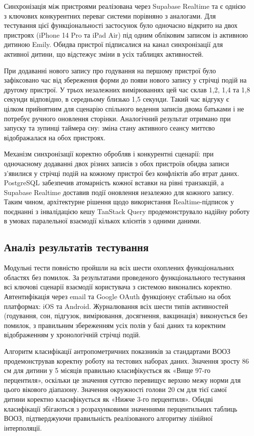 Синхронізація між пристроями реалізована через Supabase Realtime та є однією з ключових конкурентних переваг системи порівняно з аналогами. Для тестування цієї функціональності застосунок було одночасно відкрито на двох пристроях (iPhone 14 Pro та iPad Air) під одним обліковим записом із активною дитиною Emily. Обидва пристрої підписалися на канал синхронізації для активної дитини, що відстежує зміни в усіх таблицях активностей.

При додаванні нового запису про годування на першому пристрої було зафіксовано час від збереження форми до появи нового запису у стрічці подій на другому пристрої. У трьох незалежних вимірюваннях цей час склав 1,2, 1,4 та 1,8 секунди відповідно, в середньому близько 1,5 секунди. Такий час відгуку є цілком прийнятним для сценарію спільного ведення записів двома батьками і не потребує ручного оновлення сторінки. Аналогічний результат отримано при запуску та зупинці таймера сну: зміна стану активного сеансу миттєво відображалася на обох пристроях.

Механізм синхронізації коректно обробляв і конкурентні сценарії: при одночасному додаванні двох різних записів з обох пристроїв обидва записи з'явилися у стрічці подій на кожному пристрої без конфліктів або втрат даних. PostgreSQL забезпечив атомарність кожної вставки на рівні транзакцій, а Supabase Realtime доставив події оновлення незалежно для кожного запису. Таким чином, архітектурне рішення щодо використання Realtime-підписок у поєднанні з інвалідацією кешу TanStack Query продемонструвало надійну роботу в умовах паралельної взаємодії кількох клієнтів з одними даними.

\subsection{Аналіз результатів тестування}

Модульні тести повністю пройшли на всіх шести охоплених функціональних областях без помилок. За результатами проведеного функціонального тестування всі ключові сценарії взаємодії користувача з системою виконались коректно. Автентифікація через email та Google \gls{OAuth} функціонує стабільно на обох платформах: iOS та Android. Журналювання всіх шести типів активностей (годування, сон, підгузок, вимірювання, досягнення, вакцинація) виконується без помилок, з правильним збереженням усіх полів у базі даних та коректним відображенням у хронологічній стрічці подій.

Алгоритм класифікації антропометричних показників за стандартами \gls{ВООЗ} продемонстрував коректну роботу на тестових наборах даних. Значення зросту 86 см для дитини у 5 місяців правильно класифікується як «Вище 97-го перцентиля», оскільки це значення суттєво перевищує верхню межу норми для цього вікового діапазону. Значення окружності голови 20 см для тієї самої дитини коректно класифікується як «Нижче 3-го перцентиля». Обидві класифікації збігаються з розрахунковими значеннями перцентильних таблиць \gls{ВООЗ}, підтверджуючи правильність реалізованого алгоритму лінійної інтерполяції.


